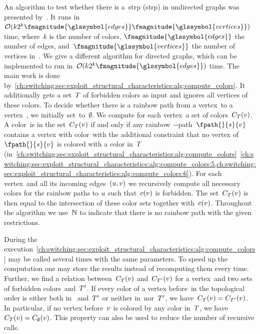 %
\begingroup
    
    \label{ch:switching:problems:Rainbow_s_t_path-Decision_Problem}
\endgroup
%
An algorithm to test whether there is a~\acrlong{strp} (\gls{strp}) in
undirected graphs was presented by~\textcite[Theorem~11]{Uch13}. It runs
in~$\bigO(k2^k \fmagnitude{\glssymbol{edges}}\fmagnitude{\glssymbol{vertices}})$
time, where~$k$ is the number of colors, $\fmagnitude{\glssymbol{edges}}$ the
number of edges, and~$\fmagnitude{\glssymbol{vertices}}$ the number of vertices
in~. We give a different algorithm for directed graphs, which
can be implemented to run in~$\bigO(k2^k\fmagnitude{\glssymbol{edges}})$ time.
The main work is done
by~\cref{ch:switching:sec:exploit_structural_characteristics:alg:compute_colors}.
It additionally gets a set~$T$ of forbidden colors as input and ignores
all vertices of these colors. To decide whether there is a rainbow path from a
vertex~\source to a vertex~\target, we initially set~\forbidden to~$\emptyset$.
We compute for each vertex~\vertex a set of
colors~$C_T(v)$. A color~\col is in the
set~$C_T(v)$ if and only if any
rainbow~\source-\vertex-path~$\fpath{}{\source}{\vertex}$ contains a vertex with
color~\col with the additional constraint that no vertex of~$\fpath{}{\source}
{\vertex}$ is colored with a color in~$T$
(in~\cref{ch:switching:sec:exploit_structural_characteristics:alg:compute_colors}~\cref{ch:switching:sec:exploit_structural_characteristics:alg:compute_colors:5,ch:switching:sec:exploit_structural_characteristics:alg:compute_colors:6}).
For each vertex~\vertexb and all its incoming edges~$(u,v)$ we
recursively compute all necessary colors for the rainbow paths to $u$
such that~$c(v)$ is forbidden. The
set~$C_T(v)$ is then equal to the intersection of
these color sets together with~$c(v)$. Throughout the algorithm we
use~$\mathbb{N}$ to indicate that there is no rainbow path with the given
restrictions.

During the
execution~\cref{ch:switching:sec:exploit_structural_characteristics:alg:compute_colors}
may be called several times with the same parameters. To speed up the
computation one may store the results instead of recomputing them every time.
Further, we find a relation between~$C_T(v)$
and~$C_{T'}(v)$ for a vertex~\vertex and two sets of
forbidden colors~\forbidden and~$T'$. If every color of a vertex
before~\vertex in the topological order is either both in~\forbidden
and~$T'$ or neither in~\forbidden nor~$T'$, we
have~$C_T(v) =
C_{T'}(v)$. In particular, if no vertex
before~$v$ is colored by any color in~$T$, we
have~$C_T(v)=C_\emptyset(v)$. This
property can also be used to reduce the number of recursive calls.

